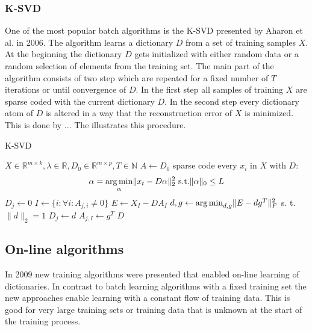 \subsubsection{K-SVD}
\label{sec:k-svd}
One of the most popular batch algorithms is the K-SVD presented by
Aharon et al. in 2006\cite{Aharon2006}. The algorithm learns a dictionary $D$
from a set of training samples $X$. At the beginning the dictionary $D$ gets
initialized with either random data or a random selection of elements from the
training set. The main part of the algorithm consists of two step which are
repeated for a fixed number of $T$ iterations or until convergence of $D$. In
the first step all samples of training $X$ are sparse coded with the current
dictionary $D$. In the second step every dictionary atom of $D$ is altered in a
way that the reconstruction error of $X$ is minimized. 
This is done by ...
The  illustrates this procedure. 

\begin{algorithm}[H]
\caption{K-SVD}
\label{alg:k-svd}
\begin{algorithmic}[1]
\REQUIRE $X \in \mathbb{R}^{m \times k}, \lambda \in
\mathbb{R}, D_0 \in \mathbb{R}^{m \times p}, T \in \mathbb{N}$
\STATE $A \gets D_0$
\STATE sparse code every $x_i$ in $X$ with $D$:
\begin{equation}
\alpha = \operatorname*{arg\,min}_{\alpha}\lVert
x_t - D\alpha\rVert_2^2 \text{ s.t.} \lVert\alpha\rVert_0 \leq L
\end{equation}
\STATE $D_j \gets 0$
\STATE $I \gets \{ i : \forall i : A_{j,i} \neq 0 \}$
\STATE $E \gets X_I - DA_I$
\STATE $d,g \gets \operatorname*{arg\,min}_{d,g} \lVert E- dg^T \rVert_F^{2}$ s. t. $\lVert d
\rVert_{2} = 1$
\STATE $D_j \gets d$
\STATE $A_{j,I} \gets g^T$
\ENDFOR 
\ENDFOR
\RETURN $D$
\end{algorithmic}
\end{algorithm}

\subsection{On-line algorithms}
In 2009 new training algorithms were presented that enabled on-line learning of
dictionaries. In contrast to batch learning algorithms with a fixed training set
the new approaches enable learning with a constant flow of training data. This
is good for very large training sets or training data that is unknown at the
start of the training process.

